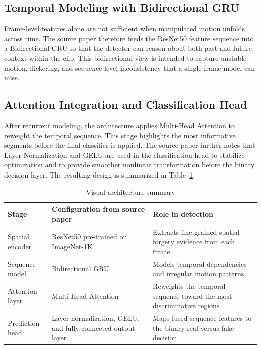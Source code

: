 \subsection{Temporal Modeling with Bidirectional GRU}

Frame-level features alone are not sufficient when manipulated motion unfolds across time. The source paper therefore feeds the ResNet50 feature sequence into a Bidirectional GRU so that the detector can reason about both past and future context within the clip. This bidirectional view is intended to capture unstable motion, flickering, and sequence-level inconsistency that a single-frame model can miss.

\subsection{Attention Integration and Classification Head}

After recurrent modeling, the architecture applies Multi-Head Attention to reweight the temporal sequence. This stage highlights the most informative segments before the final classifier is applied. The source paper further notes that Layer Normalization and GELU are used in the classification head to stabilize optimization and to provide smoother nonlinear transformation before the binary decision layer. The resulting design is summarized in Table~\ref{tab:visual-architecture}.

\begin{table}[H]
\centering
\small
\caption{Visual architecture summary}
\label{tab:visual-architecture}
\begin{tabular}{p{}p{}p{}}
\toprule
\textbf{Stage} & \textbf{Configuration from source paper} & \textbf{Role in detection} \\
\midrule
Spatial encoder & ResNet50 pre-trained on ImageNet-1K & Extracts fine-grained spatial forgery evidence from each frame \\
Sequence model & Bidirectional GRU & Models temporal dependencies and irregular motion patterns \\
Attention layer & Multi-Head Attention & Reweights the temporal sequence toward the most discriminative regions \\
Prediction head & Layer normalization, GELU, and fully connected output layer & Maps fused sequence features to the binary real-versus-fake decision \\
\bottomrule
\end{tabular}
\end{table}


